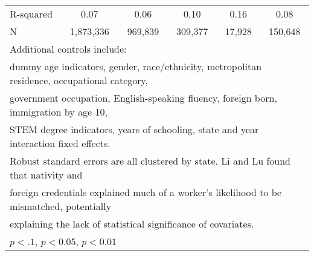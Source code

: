\begin{table}[htbp]
\begin{tabular}{l*{5}{c}}
R-squared           &        0.07         &        0.06         &        0.10         &        0.16         &        0.08         \\
N                   &   1,873,336         &     969,839         &     309,377         &      17,928         &     150,648         \\
\bottomrule
\multicolumn{6}{l}{\footnotesize Additional controls include:}\\
\multicolumn{6}{l}{\footnotesize dummy age indicators, gender, race/ethnicity, metropolitan residence, occupational category,}\\
\multicolumn{6}{l}{\footnotesize government occupation, English-speaking fluency, foreign born, immigration by age 10,}\\
\multicolumn{6}{l}{\footnotesize STEM degree indicators, years of schooling, state and year interaction fixed effects.}\\
\multicolumn{6}{l}{\footnotesize Robust standard errors are all clustered by state. Li and Lu found that nativity and}\\
\multicolumn{6}{l}{\footnotesize foreign credentials explained much of a worker's likelihood to be mismatched, potentially}\\
\multicolumn{6}{l}{\footnotesize explaining the lack of statistical significance of covariates.}\\
\multicolumn{6}{l}{\footnotesize \sym{*} \(p<.1\), \sym{**} \(p<0.05\), \sym{***} \(p<0.01\)}\\
\end{tabular}
\end{table}
